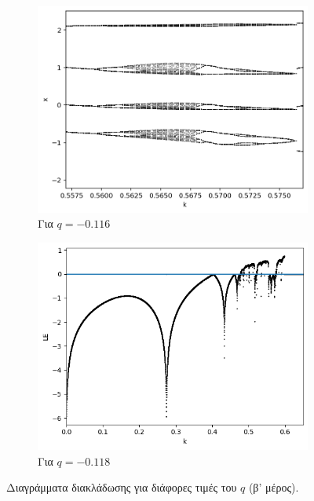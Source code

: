 \begin{figure}[ht]
	\centering
	\begin{subfigure}[b]{1\textwidth}
		\centering
		\includegraphics[width=\textwidth]{LateX images/graphs/g5}
		\caption{Για $q=-0.116$}
		\label{f:g5}
	\end{subfigure}
	\hfill
	\begin{subfigure}[b]{1\textwidth}
		\centering
		\includegraphics[width=\textwidth]{LateX images/graphs/g6}
		\caption{Για $q=-0.118$}
		\label{f:g6}
	\end{subfigure}
	
\caption{Διαγράμματα διακλάδωσης για διάφορες τιμές του $q$ (β' μέρος). }
\label{f:g2}
\end{figure}



